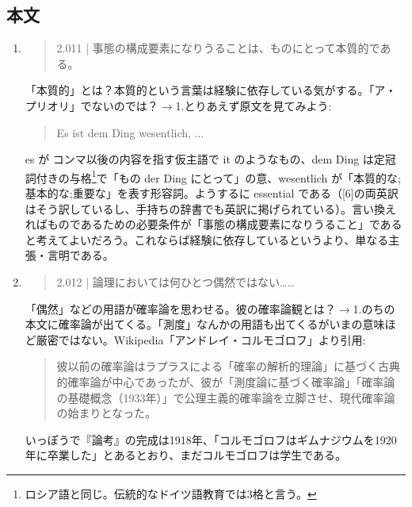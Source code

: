 \documentclass[11pt,a4paper]{jsarticle}
\begin{document}
\subsection{本文}\label{zenkadai2}
\begin{enumerate}
\item
\begin{quote}
2.011 | 事態の構成要素になりうることは、ものにとって本質的である。
\end{quote}
「本質的」とは？本質的という言葉は経験に依存している気がする。「ア・プリオリ」でないのでは？$\rightarrow$1.とりあえず原文を見てみよう:
\begin{quote}
Es ist dem Ding wesentlich, ...
\end{quote}
es が コンマ以後の内容を指す仮主語で it のようなもの、dem Ding は定冠詞付きの与格\footnote{ロシア語と同じ。伝統的なドイツ語教育では3格と言う。}で「もの der Ding にとって」の意、wesentlich が「本質的な;基本的な;重要な」を表す形容詞。ようするに essential である（[6]の両英訳はそう訳しているし、手持ちの辞書でも英訳に掲げられている）。言い換えればものであるための必要条件が「事態の構成要素になりうること」であると考えてよいだろう。これならば経験に依存しているというより、単なる主張・言明である。

\item
\begin{quote}
2.012 | 論理においては何ひとつ偶然ではない……
\end{quote}
「偶然」などの用語が確率論を思わせる。彼の確率論観とは？$\rightarrow$1.のちの本文に確率論が出てくる。「測度」なんかの用語も出てくるがいまの意味ほど厳密ではない。Wikipedia「アンドレイ・コルモゴロフ」より引用:
\begin{quote}彼以前の確率論はラプラスによる「確率の解析的理論」に基づく古典的確率論が中心であったが、彼が「測度論に基づく確率論」「確率論の基礎概念（1933年）」で公理主義的確率論を立脚させ、現代確率論の始まりとなった。
\end{quote}
いっぽうで『論考』の完成は1918年、「コルモゴロフはギムナジウムを1920年に卒業した」とあるとおり、まだコルモゴロフは学生である。



\end{enumerate}
\end{document}
